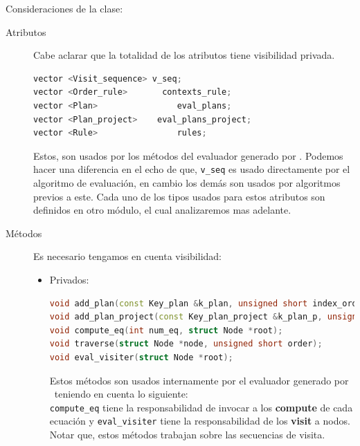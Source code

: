 Consideraciones de la clase:

\begin{description}
\item [Atributos] Cabe aclarar que la totalidad de los atributos tiene visibilidad privada.

\vspace{0.3cm}
\begin{lstlisting}[basicstyle=\scriptsize,backgroundcolor=\color{white}, language=c++, columns=fullflexible, linewidth=7cm]
vector <Visit_sequence> v_seq;
vector <Order_rule>       contexts_rule;
vector <Plan>                eval_plans;
vector <Plan_project>    eval_plans_project;
vector <Rule>                rules;
\end{lstlisting}
\vspace{0.3cm}

Estos, son usados por los métodos del evaluador generado por \maggen. Podemos hacer una diferencia en el echo de que, \texttt{v\_seq} es usado directamente por el algoritmo de evaluación, en cambio los demás son usados por algoritmos previos a este. Cada uno de los tipos usados para estos atributos son definidos en otro módulo, el cual analizaremos mas adelante.

\item [Métodos] Es necesario tengamos en cuenta visibilidad:

\begin{itemize}
\item Privados:

\vspace{0.3cm}
\begin{lstlisting}[basicstyle=\scriptsize, backgroundcolor=\color{white}, language=c++, columns=fullflexible, linewidth=13cm]
void add_plan(const Key_plan &k_plan, unsigned short index_order);
void add_plan_project(const Key_plan_project &k_plan_p, unsigned short index_order);
void compute_eq(int num_eq, struct Node *root);
void traverse(struct Node *node, unsigned short order);
void eval_visiter(struct Node *root);
\end{lstlisting}
\vspace{0.3cm}

Estos métodos son usados internamente por el evaluador generado por \maggen\ teniendo en cuenta lo siguiente:\\
\texttt{compute\_eq} tiene la responsabilidad de invocar a los \textbf{compute} de cada ecuación y \texttt{eval\_visiter} tiene la responsabilidad de los \textbf{visit} a nodos. Notar que, estos métodos trabajan sobre las secuencias de visita.


\end{itemize}
\end{description}
